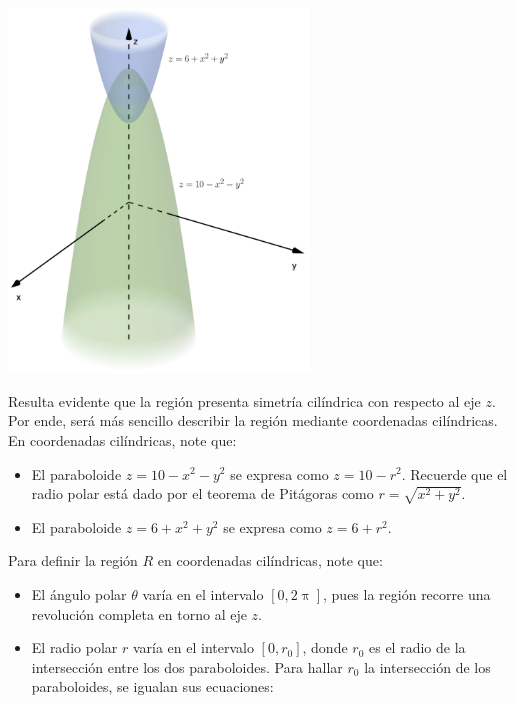 \documentclass{fmbvecto}
\begin{document}
\begin{problema}
\begin{center}
    \includegraphics[width=0.6\textwidth]{interseccion-paraboloides.png}
    \label{fig:interseccion-paraboloides}
\end{center}
\vspace*{1em}
Resulta evidente que la región presenta simetría cilíndrica con respecto al eje \(z\). Por ende, será más sencillo describir la región mediante coordenadas cilíndricas. En coordenadas cilíndricas, note que:
\begin{itemize}
    \item El paraboloide \(z = 10 - x^2 - y^2\) se expresa como \(z = 10 - r^2\). Recuerde que el radio polar está dado por el teorema de Pitágoras como \(r = \sqrt{x^2 + y^2}\).
    \item El paraboloide \(z = 6 + x^2 + y^2\) se expresa como \(z = 6 + r^2\).
\end{itemize}
\vspace*{1em}
Para definir la región \(R\) en coordenadas cilíndricas, note que:
\begin{itemize}
    \item El ángulo polar \(\theta\) varía en el intervalo \([0, 2\uppi]\), pues la región recorre una revolución completa en torno al eje \(z\).
    \item El radio polar \(r\) varía en el intervalo \([0, r_0]\), donde \(r_0\) es el radio de la intersección entre los dos paraboloides. Para hallar \(r_0\) la intersección de los paraboloides, se igualan sus ecuaciones:
    \begin{align*}

\end{align*}
\end{itemize}
\end{problema}
\end{document}

